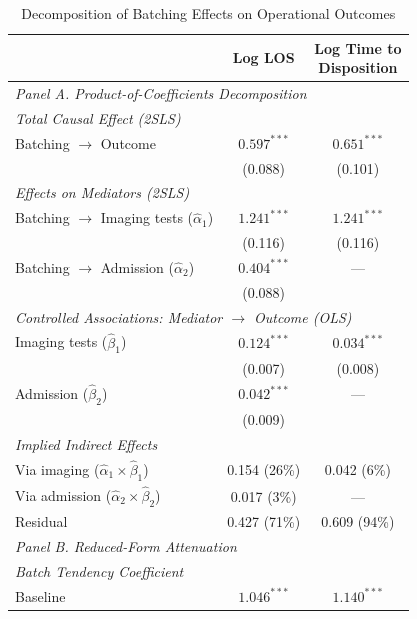 \documentclass[,,blindrev]{informs}
\begin{document}
\begin{table}[t!]
\centering
\caption{Decomposition of Batching Effects on Operational Outcomes}
\label{tab:decomp}
\begin{threeparttable}
\begin{tabular}{p{11cm}cc}
\toprule
& Log LOS & \makecell[c]{Log Time to \\ Disposition} \\
\midrule
\multicolumn{3}{l}{\textit{Panel A. Product-of-Coefficients Decomposition}} \\[0.5em]
\multicolumn{3}{l}{\quad \textit{Total Causal Effect (2SLS)}} \\[0.25em]
\quad Batching $\rightarrow$ Outcome 
& $0.597^{***}$ & $0.651^{***}$ \\
& (0.088) & (0.101) \\[0.5em]
\multicolumn{3}{l}{\quad \textit{Effects on Mediators (2SLS)}} \\[0.25em]
\quad Batching $\rightarrow$ Imaging tests ($\hat{\alpha}_1$) 
& $1.241^{***}$ & $1.241^{***}$ \\
& (0.116) & (0.116) \\[0.25em]
\quad Batching $\rightarrow$ Admission ($\hat{\alpha}_2$) 
& $0.404^{***}$ & --- \\
& (0.088) & \\[0.5em]
\multicolumn{3}{l}{\quad \textit{Controlled Associations: Mediator $\rightarrow$ Outcome (OLS)}} \\[0.25em]
\quad Imaging tests ($\hat{\beta}_1$) 
& $0.124^{***}$ & $0.034^{***}$ \\
& (0.007) & (0.008) \\[0.25em]
\quad Admission ($\hat{\beta}_2$) 
& $0.042^{***}$ & --- \\
& (0.009) & \\[0.5em]
\multicolumn{3}{l}{\quad \textit{Implied Indirect Effects}} \\[0.25em]
\quad Via imaging ($\hat{\alpha}_1 \times \hat{\beta}_1$) 
& 0.154 (26\%) & 0.042 (6\%) \\[0.25em]
\quad Via admission ($\hat{\alpha}_2 \times \hat{\beta}_2$) 
& 0.017 (3\%) & --- \\[0.25em]
\quad Residual 
& 0.427 (71\%) & 0.609 (94\%) \\[0.75em]
\midrule
\multicolumn{3}{l}{\textit{Panel B. Reduced-Form Attenuation}} \\[0.5em]
\multicolumn{3}{l}{\quad \textit{Batch Tendency Coefficient}} \\[0.25em]
\quad Baseline 
& $1.046^{***}$ & $1.140^{***}$ \\ 

\end{tabular}
\end{threeparttable}
\end{table}
\end{document}
